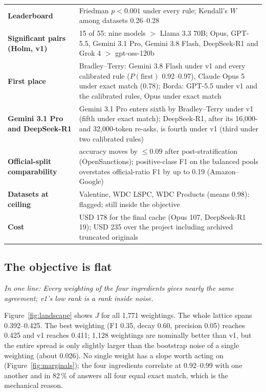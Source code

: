 \documentclass[11pt]{article}
\newcommand{\inoneline}[1]{\par\noindent\begingroup\small\textit{In one line: #1}\endgroup\par\medskip}
\begin{document}
\begin{table}[htbp]
\begin{tabularx}{\textwidth}{>{\bfseries}p{} L}
Leaderboard & Friedman $p<0.001$ under every rule; Kendall's $W$ among datasets 0.26--0.28 \\
Significant pairs (Holm, v1) & 15 of 55: nine models $>$ Llama 3.3 70B; Opus, GPT-5.5, Gemini 3.1 Pro, Gemini 3.8 Flash, DeepSeek-R1 and Grok 4 $>$ gpt-oss-120b \\
First place & Bradley--Terry: Gemini 3.8 Flash under v1 and every calibrated rule ($P(\text{first})$ 0.92--0.97), Claude Opus 5 under exact match (0.78); Borda: GPT-5.5 under v1 and the calibrated rules, Opus under exact match \\
Gemini 3.1 Pro and DeepSeek-R1 & Gemini 3.1 Pro enters sixth by Bradley--Terry under v1 (fifth under exact match); DeepSeek-R1, after its 16,000- and 32,000-token re-asks, is fourth under v1 (third under two calibrated rules) \\
Official-split comparability & accuracy moves by $\le 0.09$ after post-stratification (OpenSanctions); positive-class F1 on the balanced pools overstates official-ratio F1 by up to 0.19 (Amazon--Google) \\
Datasets at ceiling & Valentine, WDC LSPC, WDC Products (means 0.98): flagged; still inside the objective \\
Cost & USD 178 for the final cache (Opus 107, DeepSeek-R1 19); USD 235 over the project including archived truncated originals \\
\bottomrule
\end{tabularx}
\end{table}

\subsection{The objective is flat}
\inoneline{Every weighting of the four ingredients gives nearly the same agreement; v1's low rank is a rank inside noise.}
Figure~\ref{fig:landscape} shows $J$ for all 1,771 weightings. The whole lattice spans 0.392--0.425. The best weighting (F1 0.35, decay 0.60, precision 0.05) reaches 0.425 and v1 reaches 0.411; 1,128 weightings are nominally better than v1, but the entire spread is only slightly larger than the bootstrap noise of a single weighting (about 0.026). No single weight has a slope worth acting on (Figure~\ref{fig:marginals}); the four ingredients correlate at 0.92--0.99 with one another and in 82\,\% of answers all four equal exact match, which is the mechanical reason.
\end{document}
